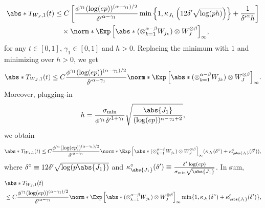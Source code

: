 \documentclass[aos]{imsart}
\begin{document}
\begin{appendix}
\begin{equation*}
\begin{aligned}
    \abs*{T_{W_J,1}(t)}
    & \leq C \left[
        \frac{\phi^{\gamma_1} (\log(ep))^{(\alpha-\gamma_1)/2}}{{\delta'}^{\alpha-\gamma_1}}
        \min\left\{1, \kappa_{J_1}\left(12 {\delta'} \sqrt{\log(ph)}\right) \right\}
        + \frac{1}{{\delta'}^\alpha h}
    \right] \\
    & \quad \times \norm*{\Exp\left[
        \abs*{(\otimes_{k=1}^{\alpha-\beta} W_{j_k}) \otimes W_J^{\otimes \beta}}
    \right]}_\infty,
\end{aligned}
\end{equation*}
for any $t \in [0,1]$, $\gamma_1 \in [0,1]$ and $h > 0$. 
Replacing the minimum with $1$ and minimizing over $h > 0$, we get
\begin{equation*}
\begin{aligned}
    \abs*{T_{W_J,1}(t)}
    \leq C \frac{\phi^{\gamma_1} (\log(ep))^{(\alpha-\gamma_1)/2}}{{\delta'}^{\alpha-\gamma_1}} 
    \norm*{\Exp\left[
        \abs*{(\otimes_{k=1}^{\alpha-\beta} W_{j_k}) \otimes W_J^{\otimes \beta}}
    \right]}_\infty.  
\end{aligned}
\end{equation*}
Moreover, plugging-in
\begin{equation*}
     h = \frac{\sigma_{\min}}{\phi^{\gamma_1} {\delta'}^{1+\gamma_1}} \sqrt{\frac{\abs{J_1}}{(\log(ep))^{\alpha-\gamma_1+2}}},
\end{equation*}
we obtain
\begin{equation*}
\begin{aligned}
    \abs*{T_{W_J,1}(t)} 
    \leq C \frac{\phi^{\gamma_1} (\log(ep))^{(\alpha-\gamma_1)/2}}{{\delta'}^{\alpha-\gamma_1}} 
    \norm*{\Exp\left[
        \abs*{(\otimes_{k=1}^{\alpha-\beta} W_{j_k}) \otimes W_J^{\otimes \beta}}
    \right]}_\infty 
    (\kappa_{J_1}(\delta^\circ) + \kappa^\circ_{\abs{J_1}}(\delta')),
\end{aligned}
\end{equation*}
where $\delta^\circ \equiv 12 \delta' \sqrt{\log(p\abs{J_1})}$ and $\kappa^\circ_{\abs{J_1}}(\delta') \equiv \frac{\delta'\log(ep)}{\sigma_{\min}\sqrt{\abs{J_1}}}$. In sum,
\begin{equation*}
\begin{aligned}
    & \abs*{T_{W_J,1}(t)} \\
    & \leq C \frac{\phi^{\gamma_1} (\log(ep))^{(\alpha-\gamma_1)/2}}{{\delta'}^{\alpha-\gamma_1}} 
    \norm*{\Exp\left[
        \abs*{(\otimes_{k=1}^{\alpha-\beta} W_{j_k}) \otimes W_J^{\otimes \beta}}
    \right]}_\infty 
    \min\{1, \kappa_{J_1}(\delta^\circ) + \kappa^\circ_{\abs{J_1}}(\delta')\},

\end{aligned}
\end{equation*}
\end{appendix}
\end{document}
